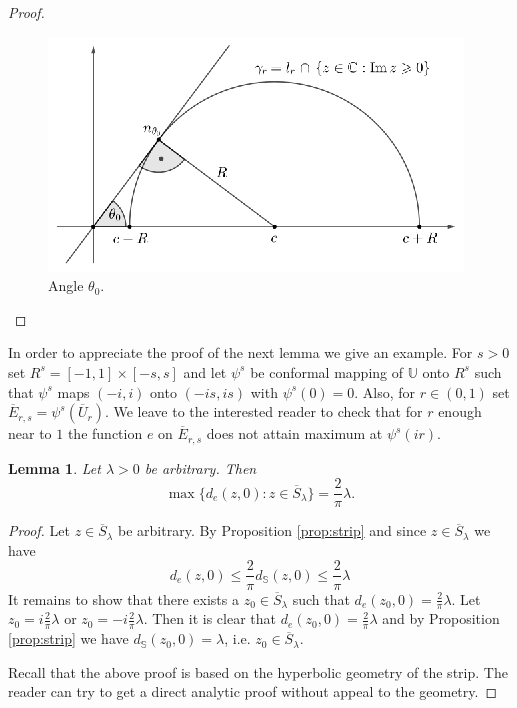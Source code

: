 \documentclass{amsart}
\newtheorem{lemma}{Lemma}
\begin{document}
\begin{proof}
\begin{figure}[H]
\includegraphics[width=0.75\linewidth]{slika03v2.eps}
\caption{Angle $\theta_0$.}\label{fig:2}
\end{figure}
\end{proof}

In order  to appreciate the  proof of the next lemma we give an example.
For $s>0$ set   $R^s= [-1,1]\times [-s,s]$ and  let $\psi^s$ be conformal   mapping of $\mathbb{U}$  onto  $R^s$   such that  $\psi^s$   maps  $(-i,i)$ onto $(-is,is)$  with
$\psi^s(0)=0$.  Also, for $r\in(0,1)$ set $\overline{E}_{r,s} = \psi^s(\overline{U}_r)$. We leave  to the interested  reader to check  that for $r$  enough near to $1$   the function $e$ on
$\overline{E}_{r,s}$  does not attain maximum at  $\psi^s(ir)$.
\begin{lemma}\label{lem:hypdisk1}
Let $\lambda>0$ be arbitrary. Then
\begin{equation}\label{}
    \max\{d_e(z,0):z\in\overline{S}_{\lambda}\}=\frac{2}{\pi}\lambda.
\end{equation}
\end{lemma}
\begin{proof}
Let $z\in\overline{S}_{\lambda}$ be arbitrary. By Proposition \ref{prop:strip} and since $z\in\overline{S}_{\lambda}$ we have
\begin{equation}\label{}
    d_{e}(z,0)\leqslant\frac{2}{\pi}d_{\mathbb{S}}(z,0)\leqslant\frac{2}{\pi}\lambda
\end{equation}
It remains to show that there exists a $z_0\in\overline{S}_{\lambda}$ such that $\displaystyle d_e(z_0,0)=\frac{2}{\pi}\lambda$. Let $\displaystyle z_0=i\frac{2}{\pi}\lambda$ or $\displaystyle z_0=-i\frac{2}{\pi}\lambda$. Then it is clear that $\displaystyle d_e(z_0,0)=\frac{2}{\pi}\lambda$ and by Proposition \ref{prop:strip} we have $d_{\mathbb{S}}(z_0,0)=\lambda$, i.e. $z_0\in\overline{S}_{\lambda}$.

Recall that the above   proof is based on the hyperbolic geometry of  the strip. The reader can try to get a direct  analytic proof without appeal to the geometry.
\end{proof}
\end{document}
